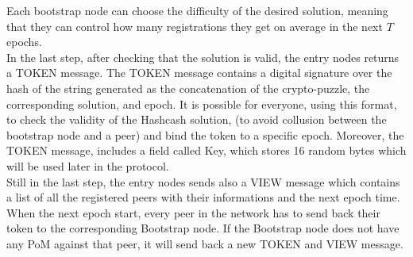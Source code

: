 \documentclass[mscthesis]{usiinfthesis}
\begin{document}
Each bootstrap node can choose the difficulty of the desired solution, meaning that they can control how many registrations they get on average in the next $T$ epochs.\\
In the last step, after checking that the solution is valid, the entry nodes returns a TOKEN message. The TOKEN message contains a digital signature over the hash of the string generated as the concatenation of the crypto-puzzle, the corresponding solution, and epoch. It is possible for everyone, using this format, to check the validity of the Hashcash solution, (to avoid collusion between the bootstrap node and a peer) and bind the token to a specific epoch. Moreover, the TOKEN message, includes a field called Key, which stores 16 random bytes which will be used later in the protocol. \\
Still in the last step, the entry nodes sends also a VIEW message which contains a list of all the registered peers with their informations and the next epoch 
time. \\
When the next epoch start, every peer in the network has to send back their token to the corresponding Bootstrap node. If the Bootstrap node does not have any PoM against that peer, it will send back a new TOKEN and VIEW message.

\begin{table}[H]
\centering
{}
\caption{Login message description}
\label{tab:hello-message}
\end{table}

\begin{table}[H]
\centering
{}
\caption{Register message description}
\label{tab:register-message}
\end{table}
\end{document}
